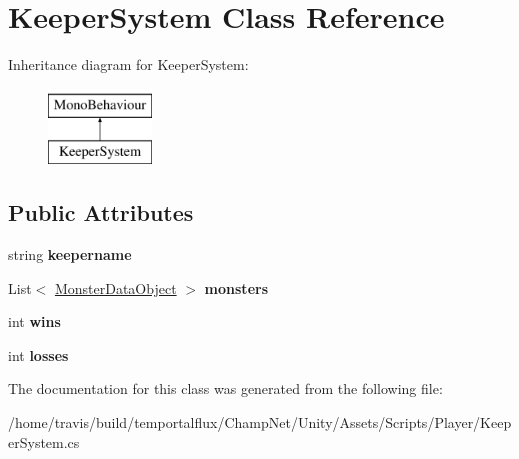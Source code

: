 \hypertarget{class_keeper_system}{\section{Keeper\-System Class Reference}
\label{class_keeper_system}
}
Inheritance diagram for Keeper\-System\-:\begin{figure}[H]
\begin{center}
\leavevmode
\includegraphics[height=2.000000cm]{class_keeper_system}
\end{center}
\end{figure}
\subsection*{Public Attributes}
\begin{DoxyCompactItemize}
\item 
\hypertarget{class_keeper_system_a351a9a8819200deb7e235c6ef2e059a6}{string {\bfseries keepername}}\label{class_keeper_system_a351a9a8819200deb7e235c6ef2e059a6}

\item 
\hypertarget{class_keeper_system_a10dc4e4959293cc3a39eda19d35e5c8c}{List$<$ \hyperlink{class_monster_data_object}{Monster\-Data\-Object} $>$ {\bfseries monsters}}\label{class_keeper_system_a10dc4e4959293cc3a39eda19d35e5c8c}

\item 
\hypertarget{class_keeper_system_a032c60966af729c76e4a09e1fa6dbadb}{int {\bfseries wins}}\label{class_keeper_system_a032c60966af729c76e4a09e1fa6dbadb}

\item 
\hypertarget{class_keeper_system_ab64ebb44295e23d56fc640ff92dfe5d2}{int {\bfseries losses}}\label{class_keeper_system_ab64ebb44295e23d56fc640ff92dfe5d2}

\end{DoxyCompactItemize}


The documentation for this class was generated from the following file\-:\begin{DoxyCompactItemize}
\item 
/home/travis/build/temportalflux/\-Champ\-Net/\-Unity/\-Assets/\-Scripts/\-Player/Keeper\-System.\-cs\end{DoxyCompactItemize}

